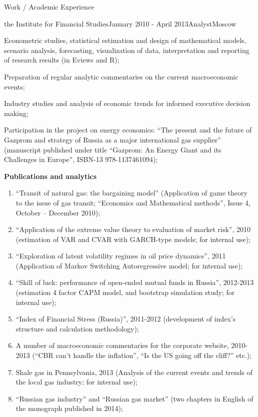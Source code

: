 \documentclass{resume} %
\begin{document}
\begin{rSection}{Work / Academic Experience}
\begin{rSubsection}{the Institute for Financial Studies}{January 2010 - April 2013}{Analyst}{Moscow}
    \item Econometric studies, statistical estimation and design of mathematical
    models, scenario analysis, forecasting, visualization of data, interpretation and
    reporting of research results (in Eviews and R);
    \item Preparation of regular analytic commentaries on the current macroeconomic
    events;
    \item Industry studies and analysis of economic trends for informed executive
    decision making;
    \item Participation in the project on energy economics: ``The present and the
    future of Gazprom and strategy of Russia as a major international gas supplier''
    (manuscript published under title ``Gazprom: An Energy Giant and its
    Challenges in Europe'', ISBN-13 978-1137461094);
    \item \textbf{Publications and analytics} \begin{enumerate}
        \item ``Transit of natural gas: the bargaining model'' (Application of game
        theory to the issue of gas transit; ``Economics and Mathematical methods'',
        Issue 4, October – December 2010);
        \item ``Application of the extreme value theory to evaluation of market risk'',
        2010 (estimation of VAR and CVAR with GARCH-type models; for internal use);
        \item ``Exploration of latent volatility regimes in oil price dynamics'',
        2011 (Application of Markov Switching Autoregressive model; for internal use);
        \item ``Skill of luck: performance of open-ended mutual funds in Russia'',
        2012-2013 (estimation 4 factor CAPM model, and bootstrap simulation study;
        for internal use);
        \item ``Index of Financial Stress (Russia)'', 2011-2012 (development of index's
        structure and calculation methodology);
        \item A number of macroeconomic commentaries for the corporate website, 2010-2013
        (``CBR can't handle the inflation'', ``Is the US going off the cliff?'' etc.);
        \item Shale gas in Pennsylvania, 2013 (Analysis of the current events and
        trends of the local gas industry; for internal use);
        \item ``Russian gas industry'' and ``Russian gas market'' (two chapters in English
        of the monograph published in 2014);
    \end{enumerate}
\end{rSubsection} \medskip

\end{rSection}
\end{document}
